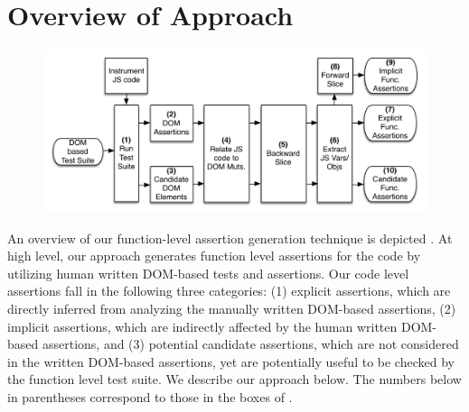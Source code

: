 \section{Overview of Approach} \label{Sec:approach}

\begin{figure}[!t]
  \centering
  \includegraphics[width=.7\hsize]{fig/approachDiagram}
  \vspace{-0.1in} 
  \label{Fig:approachDiagram}
  \vspace{-0.1in} 
\end{figure}
An overview of our \javascript function-level assertion generation technique is depicted .
At high level, our approach generates function level assertions for the \javascript code by utilizing human written DOM-based tests and assertions. Our code level assertions fall in the following three categories: (1) explicit assertions, which are directly inferred from analyzing the manually written DOM-based assertions, (2) implicit assertions, which are indirectly affected by the human written DOM-based assertions, and (3) potential candidate assertions, which are not considered in the written DOM-based assertions, yet are potentially useful to be checked by the function level test suite. We describe our approach below. The numbers below in parentheses correspond to those in the boxes of .

